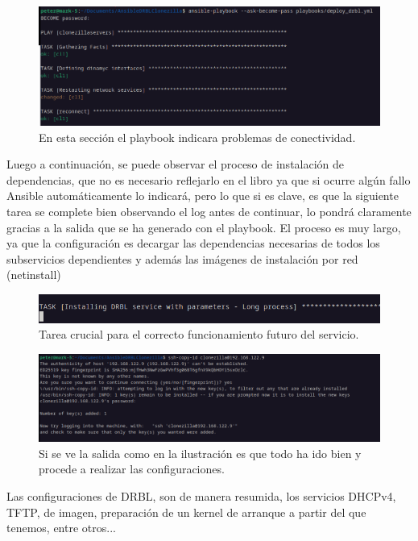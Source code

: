 \begin{figure}[H]
	\centering
	\includegraphics[scale=0.30]{deploy-drbl/deploy01}
	\caption{En esta sección el playbook indicara problemas de conectividad.}
\end{figure}

Luego a continuación, se puede observar el proceso de instalación de dependencias, que no es necesario reflejarlo en el libro ya que si ocurre algún fallo Ansible automáticamente
lo indicará, pero lo que si es clave, es que la siguiente tarea se complete bien observando el log antes de continuar, lo pondrá claramente gracias a la salida que se ha generado
con el playbook. El proceso es muy largo, ya que la configuración es decargar las dependencias necesarias de todos los subservicios dependientes y además las imágenes de instalación por red (netinstall)

\begin{figure}[H]
	\centering
	\includegraphics[scale=0.30]{deploy-drbl/deploy02}
	\caption{Tarea crucial para el correcto funcionamiento futuro del servicio.}
\end{figure}

\begin{figure}[H]
	\centering
	\includegraphics[scale=0.30]{deploy-drbl/deploy03}
	\caption{Si se ve la salida como en la ilustración es que todo ha ido bien y procede a realizar las configuraciones.}
\end{figure}

Las configuraciones de DRBL, son de manera resumida, los servicios DHCPv4, TFTP, de imagen, preparación de un kernel de arranque a partir del que tenemos, entre otros...

